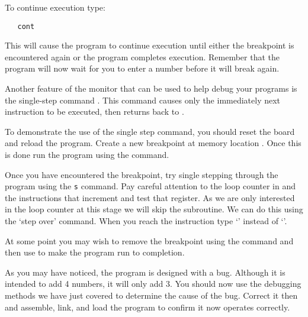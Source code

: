 To continue execution type:
\begin{verbatim}
   cont
\end{verbatim}
This will cause the program to continue execution until either the
breakpoint is encountered again or the program completes execution.
Remember that the program will now wait for you to enter a number
before it will break again.

Another feature of the monitor that can be used to help debug your programs
is the single-step command . This command causes only the
immediately next instruction to be executed, then returns back to
\WRAMPmon.

To demonstrate the use of the single step command, you should reset the
board and reload the program. Create a new breakpoint at memory location
. Once this is done run the program using the 
command.

Once you have encountered the breakpoint, try single stepping through
the program using the \verb|s| command. Pay careful attention to the
loop counter in  and the instructions that increment and test
that register. As we are only interested in the loop counter at this
stage we will skip the  subroutine. We can do this using
the `step over'  command. When you reach the instruction  type `' instead of `'.

At some point you may wish to remove the breakpoint using the
 command and then use  to make the program run to
completion.

As you may have noticed, the program is designed with a bug. Although
it is intended to add 4 numbers, it will only add 3. You should now use
the debugging methods we have just covered to determine the cause of the
bug. Correct it then and assemble, link, and load the program to confirm
it now operates correctly.

